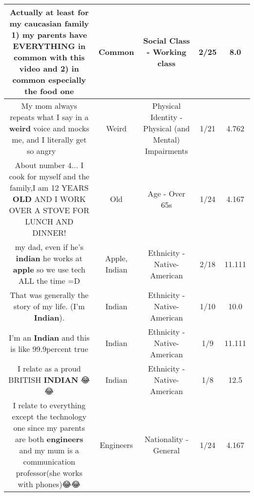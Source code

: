 \documentclass[11pt]{article}
\newlength\mylength
\begin{document}
\begin{center}
\begin{longtable}{|C{.65\mylength}|C{.30\mylength}|C{.12\mylength}|C{.12\mylength}|C{.12\mylength}|}
  \small Actually at least for my caucasian family 1) my parents have EVERYTHING in \textbf{common} with this video and 2) in \textbf{common} especially the food one\normalsize   & Common & Social Class - Working class & 2/25 & 8.0 \\  \hline
  \small My mom always repeats what I say in a \textbf{weird} voice and mocks me, and I literally get so angry 🤦🏻‍♀️🤦🏻‍♀️\normalsize   & Weird & Physical Identity - Physical (and Mental) Impairments & 1/21 & 4.762 \\  \hline
  \small About number 4... I cook for myself and the family,I am 12 YEARS \textbf{OLD} AND I WORK OVER A STOVE FOR LUNCH AND DINNER!\normalsize   & Old & Age - Over 65s & 1/24 & 4.167 \\  \hline
  \small my dad, even if he's \textbf{indian} he works at \textbf{apple} so we use tech ALL the time =D\normalsize   & Apple, Indian & Ethnicity - Native-American & 2/18 & 11.111 \\  \hline
  \small That  was generally the story of my life. (I'm \textbf{Indian}).\normalsize   & Indian & Ethnicity - Native-American & 1/10 & 10.0 \\  \hline
  \small I'm an \textbf{Indian} and this is like 99.9percent true\normalsize   & Indian & Ethnicity - Native-American & 1/9 & 11.111 \\  \hline
  \small I relate as a proud BRITISH \textbf{INDIAN} 😂😂\normalsize   & Indian & Ethnicity - Native-American & 1/8 & 12.5 \\  \hline
  \small I relate to everything except the technology one since my parents are both \textbf{engineers} and my mum is a communication professor(she works with phones)😂😂\normalsize   & Engineers & Nationality - General & 1/24 & 4.167 \\  \hline

\end{longtable}
\end{center}
\end{document}
